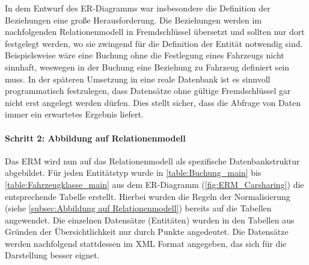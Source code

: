 In dem Entwurf des ER-Diagramms war insbesondere die Definition der Beziehungen eine gro\ss e Herausforderung. Die Beziehungen werden im nachfolgenden Relationenmodell in Fremdschlüssel übersetzt und sollten nur dort festgelegt werden, wo sie zwingend für die Definition der Entität notwendig sind. Beispielsweise wäre eine Buchung ohne die Festlegung eines Fahrzeugs nicht sinnhaft, weswegen in der Buchung eine Beziehung zu Fahrzeug definiert sein muss. In der späteren Umsetzung in eine reale Datenbank ist es sinnvoll programmatisch festzulegen, dass Datensätze ohne gültige Fremdschlüssel gar nicht erst angelegt werden dürfen. Dies stellt sicher, dass die Abfrage von Daten immer ein erwartetes Ergebnis liefert.

\paragraph{Schritt 2: Abbildung auf Relationenmodell}
Das ERM wird nun auf das Relationenmodell als spezifische Datenbankstruktur abgebildet. Für jeden Entitätstyp wurde in \ref{table:Buchung_main} bis \ref{table:Fahrzeugklasse_main} aus dem ER-Diagramm (\autoref{fig:ERM_Carsharing}) die entsprechende Tabelle erstellt. Hierbei wurden die Regeln der Normalisierung (siehe \autoref{subsec:Abbildung auf Relationenmodell}) bereits auf die Tabellen angewendet. Die einzelnen Datensätze (Entitäten) wurden in den Tabellen aus Gründen der Übersichtlichkeit nur durch Punkte angedeutet. Die Datensätze werden nachfolgend stattdessen im XML Format angegeben, das sich für die Darstellung besser eignet.

